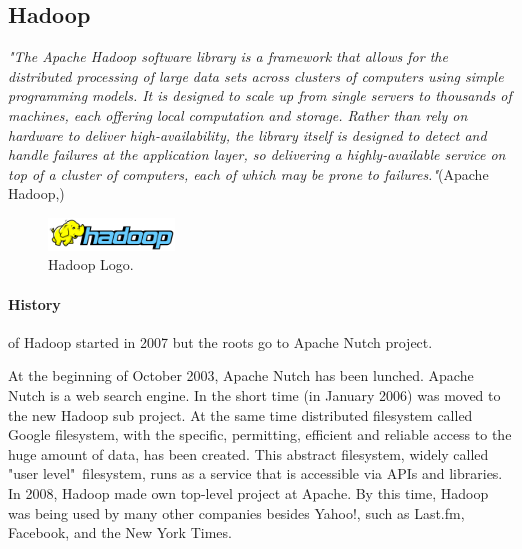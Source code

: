 \documentclass[a4paper,12pt,oneside]{report}
\begin{document}
	\subsection*{Hadoop}
	\emph{"The Apache Hadoop software library is a framework that allows for the
		distributed
		processing of large data sets across clusters of computers using simple
		programming 
		models. It is designed to scale up from single servers to 
		thousands of machines, each offering local computation and storage. Rather
		than rely 
		on hardware to deliver high-availability, the library itself is
		designed to detect and handle failures at the application layer, so
		delivering a 
		highly-available service on top of a cluster of computers,
		each of which may be prone to failures."}(Apache Hadoop,\cite{hadoop_web})
	\begin{figure}[!htbp]
		\centering
		\includegraphics[width=0.3\textwidth]{./img/664px-Hadoop_logo.png}
		\caption[Hadoop logo]{\centering Hadoop Logo.}
	\end{figure}
	
	\paragraph*{History} of Hadoop started in 2007 but the roots go
	to Apache Nutch project. 
	
	At the beginning of October 2003, Apache Nutch\cite{nutch_web} has been lunched.
	Apache Nutch is a  web search engine. In the short time (in January 2006) was
	moved to the new Hadoop sub project.
	At the same time  distributed filesystem called Google
	filesystem\cite{google_fs}, with the specific, permitting, efficient and
	reliable access	to the huge amount of data, has been created. This abstract filesystem, widely
	called "user level"~filesystem, runs as a service that is accessible via APIs and libraries. 
	In 2008, Hadoop made own top-level project at Apache.\cite{hadoop_news_web}
	By this time, Hadoop was being used by many
	other companies besides Yahoo!, such as Last.fm, Facebook, and the New York
	Times. 
	
\end{document}
